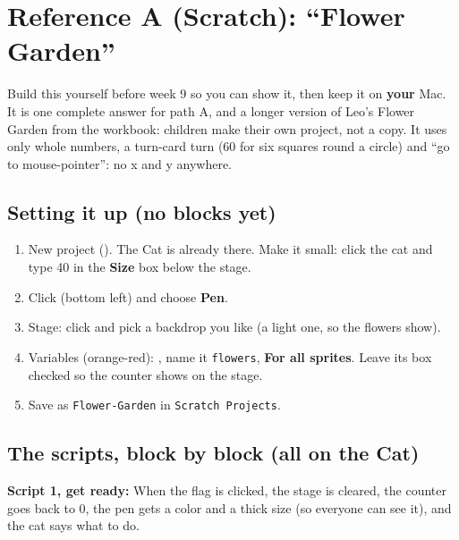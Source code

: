 \documentclass[track=junior,level=3,teacher]{kidscode}
\newenvironment{refscript}[2]{\par\needspace{8\baselineskip}\noindent\textbf{\color{kcaccent}#1:} #2\par\smallskip\begin{center}\begin{scratch}[scale=0.8]}{\end{scratch}\end{center}}
\begin{document}
\section{Reference A (Scratch): \enquote{Flower Garden}}
Build this yourself before week 9 so you can show it, then keep it on \textbf{your} Mac. It is one
complete answer for path A, and a longer version of Leo's Flower Garden from the workbook: children
make their own project, not a copy. It uses only whole numbers, a turn-card turn (60 for six squares
round a circle) and \enquote{go to mouse-pointer}: no x and y anywhere.

\subsection{Setting it up (no blocks yet)}
\begin{enumerate}[itemsep=2pt]
  \item New project (). The Cat is already there. Make it small: click the cat and type
        40 in the \textbf{Size} box below the stage.
  \item Click  (bottom left) and choose \textbf{Pen}.
  \item Stage: click  and pick a backdrop you like (a light one, so the flowers show).
  \item Variables (orange-red): , name it \texttt{flowers}, \textbf{For all sprites}.
        Leave its box checked so the counter shows on the stage.
  \item Save as \texttt{Flower-Garden} in \texttt{Scratch Projects}.
\end{enumerate}

\subsection{The scripts, block by block (all on the Cat)}
\begin{refscript}{Script 1, get ready}{When the flag is clicked, the stage is cleared, the counter goes back to 0, the pen gets a color and a thick size (so everyone can see it), and the cat says what to do.}
\end{refscript}
\end{document}
